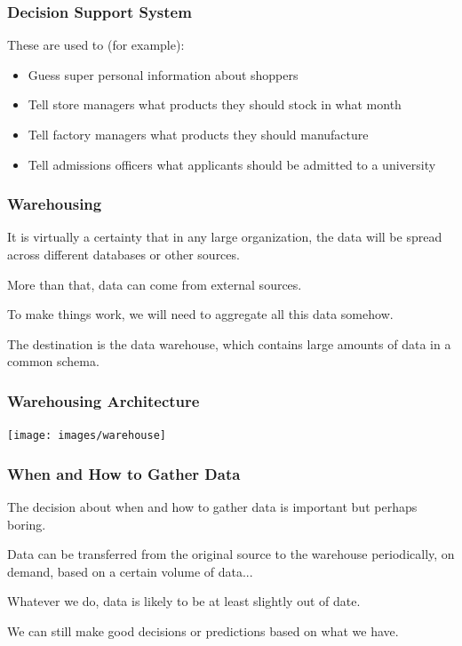 \begin{frame}
\frametitle{Decision Support System}

These are used to (for example):

\begin{itemize}
 \item Guess super personal information about shoppers
 \item Tell store managers what products they should stock in what month
 \item Tell factory managers what products they should manufacture
 \item Tell admissions officers what applicants should be admitted to a university
\end{itemize}

\end{frame}


\begin{frame}
\frametitle{Warehousing}

It is virtually a certainty that in any large organization, the data will be spread across different databases or other sources. 

More than that, data can come from external sources.

To make things work, we will need to aggregate all this data somehow. 

The destination is the data warehouse, which contains large amounts of data in a common schema.

\end{frame}

\begin{frame}
\frametitle{Warehousing Architecture}

\begin{center}
\texttt{[image: images/warehouse]}
\end{center}


\end{frame}

\begin{frame}
\frametitle{When and How to Gather Data}

The decision about when and how to gather data is important but perhaps boring. 

Data can be transferred from the original source to the warehouse periodically, on demand, based on a certain volume of data...

Whatever we do, data is likely to be at least slightly out of date.

We can still make good decisions or predictions based on what we have.

\end{frame}


